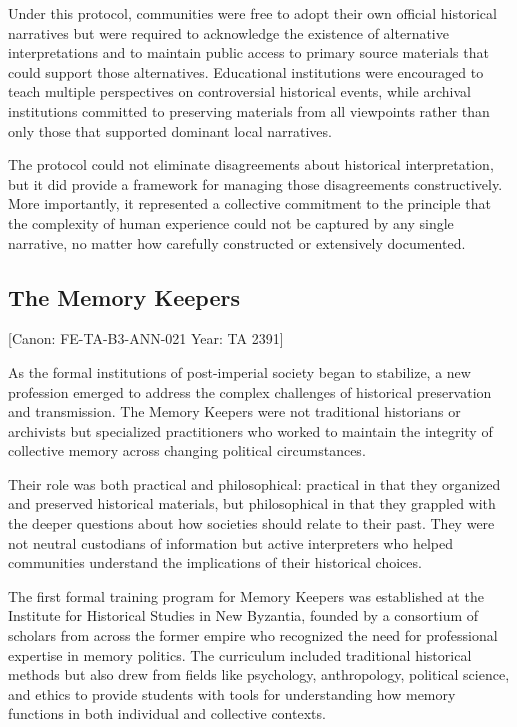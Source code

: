 Under this protocol, communities were free to adopt their own official
historical narratives but were required to acknowledge the existence of
alternative interpretations and to maintain public access to primary
source materials that could support those alternatives. Educational
institutions were encouraged to teach multiple perspectives on
controversial historical events, while archival institutions committed
to preserving materials from all viewpoints rather than only those that
supported dominant local narratives.

The protocol could not eliminate disagreements about historical
interpretation, but it did provide a framework for managing those
disagreements constructively. More importantly, it represented a
collective commitment to the principle that the complexity of human
experience could not be captured by any single narrative, no matter how
carefully constructed or extensively documented.

\subsection{The Memory Keepers}\label{the-memory-keepers}

{[}Canon: FE-TA-B3-ANN-021 \textbar{} Year: TA 2391{]}

As the formal institutions of post-imperial society began to stabilize,
a new profession emerged to address the complex challenges of historical
preservation and transmission. The Memory Keepers were not traditional
historians or archivists but specialized practitioners who worked to
maintain the integrity of collective memory across changing political
circumstances.

Their role was both practical and philosophical: practical in that they
organized and preserved historical materials, but philosophical in that
they grappled with the deeper questions about how societies should
relate to their past. They were not neutral custodians of information
but active interpreters who helped communities understand the
implications of their historical choices.

The first formal training program for Memory Keepers was established at
the Institute for Historical Studies in New Byzantia, founded by a
consortium of scholars from across the former empire who recognized the
need for professional expertise in memory politics. The curriculum
included traditional historical methods but also drew from fields like
psychology, anthropology, political science, and ethics to provide
students with tools for understanding how memory functions in both
individual and collective contexts.

